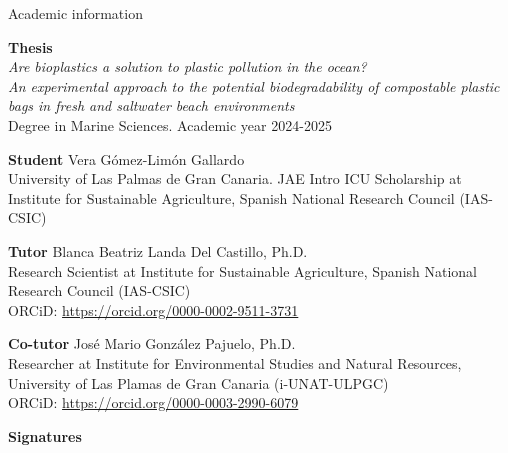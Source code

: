 \begin{flushleft}
  \Large
    Academic information
        
  \vspace{0.5cm}
  \normalsize
  \textbf{Thesis}\\
  \textit{Are bioplastics a solution to plastic pollution in the ocean?\\
  An experimental approach to the potential biodegradability of compostable plastic bags in fresh and saltwater beach environments}\\
  Degree in Marine Sciences. Academic year 2024-2025
  
  \vspace{0.5cm}
  \textbf{Student}
    Vera Gómez-Limón Gallardo\\
    University of Las Palmas de Gran Canaria. JAE Intro ICU Scholarship at Institute for Sustainable Agriculture, Spanish National Research Council (IAS-CSIC)
  
  \vspace{0.5cm}
  \textbf{Tutor}
    Blanca Beatriz Landa Del Castillo, Ph.D.\\
    Research Scientist at Institute for Sustainable Agriculture, Spanish National Research Council (IAS-CSIC)\\
    ORCiD: \url{https://orcid.org/0000-0002-9511-3731}
  
  \vspace{0.5cm}
  \textbf{Co-tutor}
    José Mario González Pajuelo, Ph.D.\\
    Researcher at Institute for Environmental Studies and Natural Resources, University of Las Plamas de Gran Canaria (i-UNAT-ULPGC)\\
    ORCiD: \url{https://orcid.org/0000-0003-2990-6079}
  
  \vspace{0.5cm}
  \centerline{\textbf{Signatures}}
\end{flushleft}